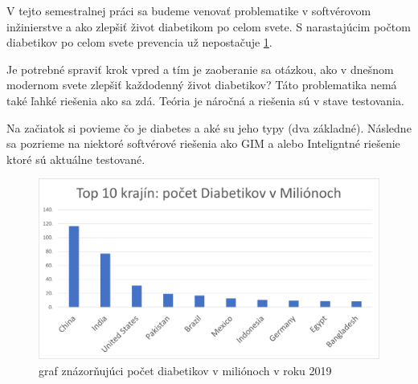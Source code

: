 V tejto semestralnej práci sa budeme venovať problematike v softvérovom inžinierstve a ako zlepšiť život diabetikom po celom svete. S narastajúcim počtom diabetikov po celom svete prevencia už nepostačuje \ref{graf}.

Je potrebné spraviť krok vpred a tím je zaoberanie sa otázkou, ako v dnešnom modernom svete zlepšiť každodenný život diabetikov? 
Táto problematika nemá také ľahké riešenia ako sa zdá. Teória je náročná a riešenia sú v stave testovania.

Na začiatok si povieme čo je diabetes a aké su jeho typy (dva základné). Následne sa pozrieme na niektoré softvérové riešenia ako GIM a alebo Inteligntné riešenie ktoré sú aktuálne testované.
 
\begin{figure}[H]
\centering
\includegraphics[width=\linewidth]{pocet_diabetikov.png}
\caption{graf znázorňujúci počet diabetikov v miliónoch v roku 2019 \cite{2019s}}
\label{graf}
\end{figure}






